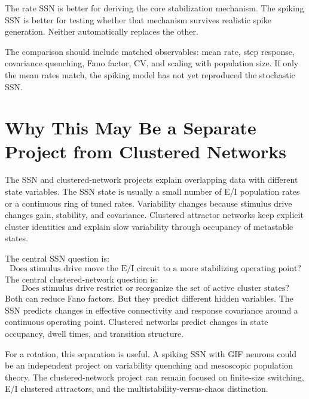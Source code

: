 The rate SSN is better for deriving the core stabilization mechanism. The spiking SSN is better for testing whether that mechanism survives realistic spike generation. Neither automatically replaces the other.

The comparison should include matched observables: mean rate, step response, covariance quenching, Fano factor, CV, and scaling with population size. If only the mean rates match, the spiking model has not yet reproduced the stochastic SSN.

\section{Why This May Be a Separate Project from Clustered Networks}
\label{sec:why-spiking-ssn-separate-from-clustered-networks}

The SSN and clustered-network projects explain overlapping data with different state variables. The SSN state is usually a small number of E/I population rates or a continuous ring of tuned rates. Variability changes because stimulus drive changes gain, stability, and covariance. Clustered attractor networks keep explicit cluster identities and explain slow variability through occupancy of metastable states.

The central SSN question is:
%
\begin{equation}
  \text{Does stimulus drive move the E/I circuit to a more stabilizing operating point?}
  \label{eq:ssn-central-question}
\end{equation}
%
The central clustered-network question is:
%
\begin{equation}
  \text{Does stimulus drive restrict or reorganize the set of active cluster states?}
  \label{eq:cluster-central-question}
\end{equation}
%
Both can reduce Fano factors. But they predict different hidden variables. The SSN predicts changes in effective connectivity and response covariance around a continuous operating point. Clustered networks predict changes in state occupancy, dwell times, and transition structure.

For a rotation, this separation is useful. A spiking SSN with GIF neurons could be an independent project on variability quenching and mesoscopic population theory. The clustered-network project can remain focused on finite-size switching, E/I clustered attractors, and the multistability-versus-chaos distinction.


